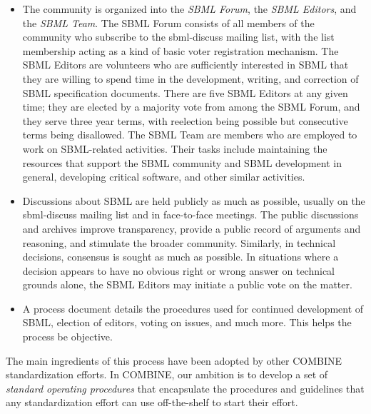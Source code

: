 \vspace*{-1em}
\begin{itemize}

\item The community is organized into the \emph{SBML Forum}, the \emph{SBML Editors}, and the \emph{SBML Team}. The SBML Forum consists of all members of the community who subscribe to the sbml-discuss mailing list, with the list membership acting as a kind of basic voter registration mechanism.  The SBML Editors are volunteers who are sufficiently interested in SBML that they are willing to spend time in the development, writing, and correction of SBML specification documents.  There are five SBML Editors at any given time; they are elected by a majority vote from among the SBML Forum, and they serve three year terms, with reelection being possible but consecutive terms being disallowed.  The SBML Team are members who are employed to work on SBML-related activities.  Their tasks include maintaining the resources that support the SBML community and SBML development in general, developing critical software, and other similar activities.
 
\item Discussions about SBML are held publicly as much as possible, usually on the sbml-discuss mailing list and in face-to-face meetings.  The public discussions and archives improve transparency, provide a public record of arguments and reasoning, and stimulate the broader community.  Similarly, in technical decisions, consensus is sought as much as possible. In situations where a decision appears to have no obvious right or wrong answer on technical grounds alone, the SBML Editors may initiate a public vote on the matter.

\item A process document details the procedures used for continued development of SBML, election of editors, voting on issues, and much more.  This helps the process be objective.

\end{itemize}
\vspace*{-1em}

The main ingredients of this process have been adopted by other COMBINE standardization efforts.  In COMBINE, our ambition is to develop a set of \emph{standard operating procedures} that encapsulate the procedures and guidelines that any standardization effort can use off-the-shelf to start their effort.






